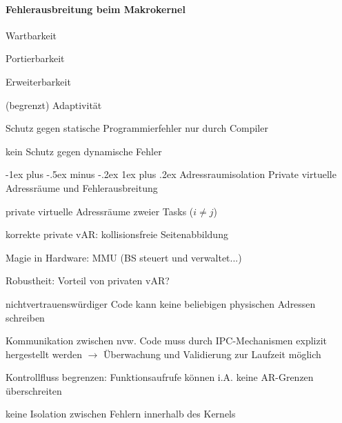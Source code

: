 \documentclass[a4paper]{article}
\makeatletter
\newcommand{\cmark}{\ding{51}}
\newcommand{\xmark}{\ding{55}}
\renewcommand{\subsubsection}{\@startsection{subsubsection}{3}{0mm}%
 {-1ex plus -.5ex minus -.2ex}%
 {1ex plus .2ex}%
 {\normalfont\small\bfseries}}
\makeatother
\begin{document}
\begin{multicols}{3}
    \paragraph{Fehlerausbreitung beim Makrokernel}
    \begin{itemize*}
        \item[\cmark] Wartbarkeit
        \item[\cmark] Portierbarkeit
        \item[\cmark] Erweiterbarkeit
        \item (begrenzt) Adaptivität
        \item Schutz gegen statische Programmierfehler nur durch Compiler
        \item[\xmark] kein Schutz gegen dynamische Fehler
    \end{itemize*}

    \subsubsection{Adressraumisolation}
    Private virtuelle Adressräume und Fehlerausbreitung
    \begin{itemize*}
        \item private virtuelle Adressräume zweier Tasks ($i\not= j$)
        \item korrekte private vAR: kollisionsfreie Seitenabbildung
        \item Magie in Hardware: MMU (BS steuert und verwaltet...)
    \end{itemize*}
    Robustheit: Vorteil von privaten vAR?
    \begin{itemize*}
        \item[\cmark] nichtvertrauenswürdiger Code kann keine beliebigen physischen Adressen schreiben
        \item[\cmark] Kommunikation zwischen nvw. Code muss durch IPC-Mechanismen explizit hergestellt werden $\rightarrow$ Überwachung und Validierung zur Laufzeit möglich
        \item[\cmark] Kontrollfluss begrenzen: Funktionsaufrufe können i.A. keine AR-Grenzen überschreiten
        \item keine Isolation zwischen Fehlern innerhalb des Kernels
    \end{itemize*}


\end{multicols}
\end{document}

